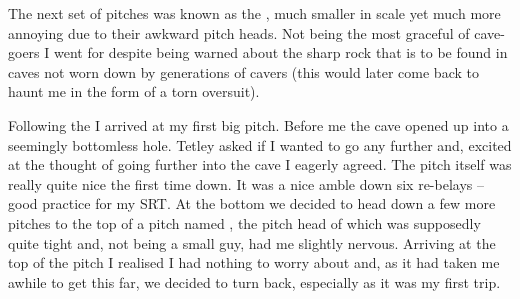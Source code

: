 The next set of pitches was known as the , much smaller in
scale yet much more annoying due to their awkward pitch heads. Not being
the most graceful of cave-goers I went for  despite being warned about
the sharp rock that is to be found in caves not worn down by generations
of cavers (this would later come back to haunt me in the form of a torn
oversuit).

Following the  I arrived at my first big pitch. Before me
the cave opened up into a seemingly bottomless hole. Tetley asked if I
wanted to go any further and, excited at the thought of going further
into the cave I eagerly agreed. The pitch itself was really quite nice
the first time down. It was a nice amble down six re-belays -- good
practice for my SRT. At the bottom we decided to head down a few more
pitches to the top of a pitch named , the pitch head of
which was supposedly quite tight and, not being a small guy, had me
slightly nervous. Arriving at the top of the pitch I realised I had
nothing to worry about and, as it had taken me awhile to get this far,
we decided to turn back, especially as it was my first trip.


